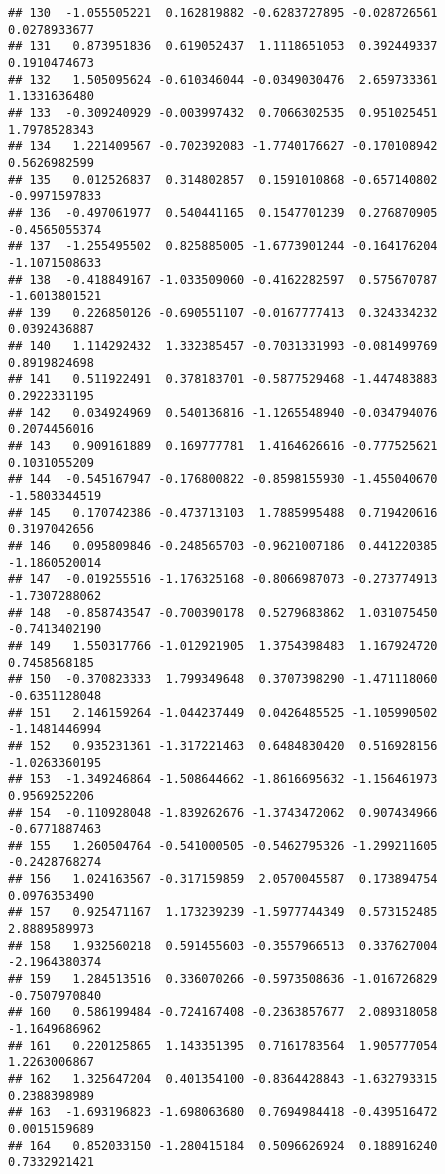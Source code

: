 \documentclass[
]{article}
\begin{document}
\begin{verbatim}
## 130  -1.055505221  0.162819882 -0.6283727895 -0.028726561  0.0278933677
## 131   0.873951836  0.619052437  1.1118651053  0.392449337  0.1910474673
## 132   1.505095624 -0.610346044 -0.0349030476  2.659733361  1.1331636480
## 133  -0.309240929 -0.003997432  0.7066302535  0.951025451  1.7978528343
## 134   1.221409567 -0.702392083 -1.7740176627 -0.170108942  0.5626982599
## 135   0.012526837  0.314802857  0.1591010868 -0.657140802 -0.9971597833
## 136  -0.497061977  0.540441165  0.1547701239  0.276870905 -0.4565055374
## 137  -1.255495502  0.825885005 -1.6773901244 -0.164176204 -1.1071508633
## 138  -0.418849167 -1.033509060 -0.4162282597  0.575670787 -1.6013801521
## 139   0.226850126 -0.690551107 -0.0167777413  0.324334232  0.0392436887
## 140   1.114292432  1.332385457 -0.7031331993 -0.081499769  0.8919824698
## 141   0.511922491  0.378183701 -0.5877529468 -1.447483883  0.2922331195
## 142   0.034924969  0.540136816 -1.1265548940 -0.034794076  0.2074456016
## 143   0.909161889  0.169777781  1.4164626616 -0.777525621  0.1031055209
## 144  -0.545167947 -0.176800822 -0.8598155930 -1.455040670 -1.5803344519
## 145   0.170742386 -0.473713103  1.7885995488  0.719420616  0.3197042656
## 146   0.095809846 -0.248565703 -0.9621007186  0.441220385 -1.1860520014
## 147  -0.019255516 -1.176325168 -0.8066987073 -0.273774913 -1.7307288062
## 148  -0.858743547 -0.700390178  0.5279683862  1.031075450 -0.7413402190
## 149   1.550317766 -1.012921905  1.3754398483  1.167924720  0.7458568185
## 150  -0.370823333  1.799349648  0.3707398290 -1.471118060 -0.6351128048
## 151   2.146159264 -1.044237449  0.0426485525 -1.105990502 -1.1481446994
## 152   0.935231361 -1.317221463  0.6484830420  0.516928156 -1.0263360195
## 153  -1.349246864 -1.508644662 -1.8616695632 -1.156461973  0.9569252206
## 154  -0.110928048 -1.839262676 -1.3743472062  0.907434966 -0.6771887463
## 155   1.260504764 -0.541000505 -0.5462795326 -1.299211605 -0.2428768274
## 156   1.024163567 -0.317159859  2.0570045587  0.173894754  0.0976353490
## 157   0.925471167  1.173239239 -1.5977744349  0.573152485  2.8889589973
## 158   1.932560218  0.591455603 -0.3557966513  0.337627004 -2.1964380374
## 159   1.284513516  0.336070266 -0.5973508636 -1.016726829 -0.7507970840
## 160   0.586199484 -0.724167408 -0.2363857677  2.089318058 -1.1649686962
## 161   0.220125865  1.143351395  0.7161783564  1.905777054  1.2263006867
## 162   1.325647204  0.401354100 -0.8364428843 -1.632793315  0.2388398989
## 163  -1.693196823 -1.698063680  0.7694984418 -0.439516472  0.0015159689
## 164   0.852033150 -1.280415184  0.5096626924  0.188916240  0.7332921421

\end{verbatim}
\end{document}
